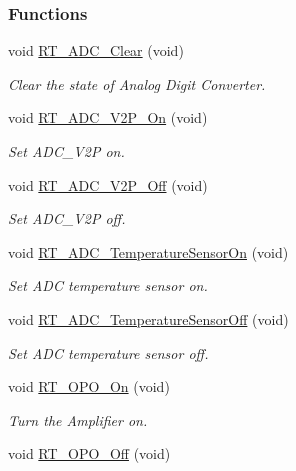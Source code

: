 \subsubsection*{Functions}
\begin{DoxyCompactItemize}
\item 
void \mbox{\hyperlink{a00002_a6f788ef3b57dbc478ab10de7356574fa}{R\+T\+\_\+\+A\+D\+C\+\_\+\+Clear}} (void)
\begin{DoxyCompactList}\small\item\em Clear the state of Analog Digit Converter. \end{DoxyCompactList}\item 
void \mbox{\hyperlink{a00002_a51bef349e15905705cba06610c5142fe}{R\+T\+\_\+\+A\+D\+C\+\_\+\+V2\+P\+\_\+\+On}} (void)
\begin{DoxyCompactList}\small\item\em Set A\+D\+C\+\_\+\+V2P on. \end{DoxyCompactList}\item 
void \mbox{\hyperlink{a00002_afa1d06c9b0f775905f17e2395cd0ce6f}{R\+T\+\_\+\+A\+D\+C\+\_\+\+V2\+P\+\_\+\+Off}} (void)
\begin{DoxyCompactList}\small\item\em Set A\+D\+C\+\_\+\+V2P off. \end{DoxyCompactList}\item 
void \mbox{\hyperlink{a00002_afd0ecdb5dcb37d2a26bd85fb060ee15b}{R\+T\+\_\+\+A\+D\+C\+\_\+\+Temperature\+Sensor\+On}} (void)
\begin{DoxyCompactList}\small\item\em Set A\+DC temperature sensor on. \end{DoxyCompactList}\item 
void \mbox{\hyperlink{a00002_a99cb1f9dcaee38a9ce2bd5e9eca49f33}{R\+T\+\_\+\+A\+D\+C\+\_\+\+Temperature\+Sensor\+Off}} (void)
\begin{DoxyCompactList}\small\item\em Set A\+DC temperature sensor off. \end{DoxyCompactList}\item 
void \mbox{\hyperlink{a00002_a6304dd2bf95eefdafda9caa159beafdc}{R\+T\+\_\+\+O\+P\+O\+\_\+\+On}} (void)
\begin{DoxyCompactList}\small\item\em Turn the Amplifier on. \end{DoxyCompactList}\item 
void \mbox{\hyperlink{a00002_ad981e76e736802e0d75c93aa87239c21}{R\+T\+\_\+\+O\+P\+O\+\_\+\+Off}} (void)

\end{DoxyCompactItemize}
